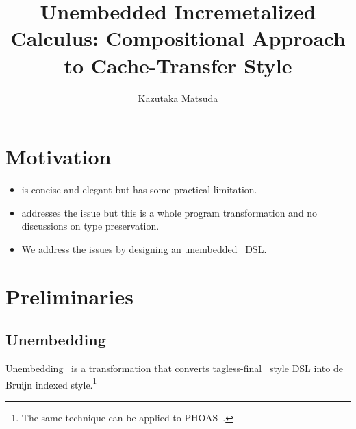 \documentclass{article}
\title{Unembedded Incremetalized Calculus: Compositional Approach to Cache-Transfer Style}
\author{Kazutaka Matsuda}
\let\cite=\citep
\theoremstyle{definition}
\begin{document}
\maketitle 


\section{Motivation}

\begin{itemize}
 \item \citet{CaiGRO14} is concise and elegant but has some practical limitation. 
 \item \citet{GiarrussoRS19} addresses the issue but this is a whole program transformation and 
   no discussions on type preservation. 
 \item We address the issues by designing an unembedded~\cite{AtLY09,Atkey09} DSL. 
\end{itemize} 

\section{Preliminaries}

\subsection{Unembedding}

Unembedding~\cite{AtLY09,Atkey09} is a transformation that converts tagless-final~\cite{CaKS09} style DSL into de Bruijn indexed style.\footnote{The same technique can be applied to PHOAS~\cite{Chlipala08}.}
\end{document}
